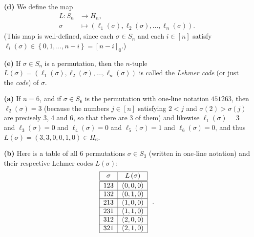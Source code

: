 \begin{definition}
\textbf{(d)} We define the map%
\begin{align*}
L:S_{n}  &  \rightarrow H_{n},\\
\sigma &  \mapsto\left(  \ell_{1}\left(  \sigma\right)  ,\ell_{2}\left(
\sigma\right)  ,\ldots,\ell_{n}\left(  \sigma\right)  \right)  .
\end{align*}
(This map is well-defined, since each $\sigma\in S_{n}$ and each $i\in\left[
n\right]  $ satisfy $\ell_{i}\left(  \sigma\right)  \in\left\{  0,1,\ldots
,n-i\right\}  =\left[  n-i\right]  _{0}$.) \medskip

\textbf{(e)} If $\sigma\in S_{n}$ is a permutation, then the $n$-tuple
$L\left(  \sigma\right)  =\left(  \ell_{1}\left(  \sigma\right)  ,\ell
_{2}\left(  \sigma\right)  ,\ldots,\ell_{n}\left(  \sigma\right)  \right)  $
is called the \emph{Lehmer code} (or just the \emph{code}) of $\sigma$.
\end{definition}

\begin{example}
\label{exa.perm.lehmer1}\textbf{(a)} If $n=6$, and if $\sigma\in S_{6}$ is the
permutation with one-line notation $451263$, then $\ell_{2}\left(
\sigma\right)  =3$ (because the numbers $j\in\left[  n\right]  $ satisfying
$2<j$ and $\sigma\left(  2\right)  >\sigma\left(  j\right)  $ are precisely
$3$, $4$ and $6$, so that there are $3$ of them) and likewise $\ell_{1}\left(
\sigma\right)  =3$ and $\ell_{3}\left(  \sigma\right)  =0$ and $\ell
_{4}\left(  \sigma\right)  =0$ and $\ell_{5}\left(  \sigma\right)  =1$ and
$\ell_{6}\left(  \sigma\right)  =0$, and thus $L\left(  \sigma\right)
=\left(  3,3,0,0,1,0\right)  \in H_{6}$. \medskip

\textbf{(b)} Here is a table of all $6$ permutations $\sigma\in S_{3}$
(written in one-line notation) and their respective Lehmer codes $L\left(
\sigma\right)  $:%
\[%
\begin{tabular}
[c]{|c|c|}\hline
$\sigma$ & $L\left(  \sigma\right)  $\\\hline\hline
$123$ & $\left(  0,0,0\right)  $\\\hline
$132$ & $\left(  0,1,0\right)  $\\\hline
$213$ & $\left(  1,0,0\right)  $\\\hline
$231$ & $\left(  1,1,0\right)  $\\\hline
$312$ & $\left(  2,0,0\right)  $\\\hline
$321$ & $\left(  2,1,0\right)  $\\\hline
\end{tabular}
\ \ .
\]

\end{example}

